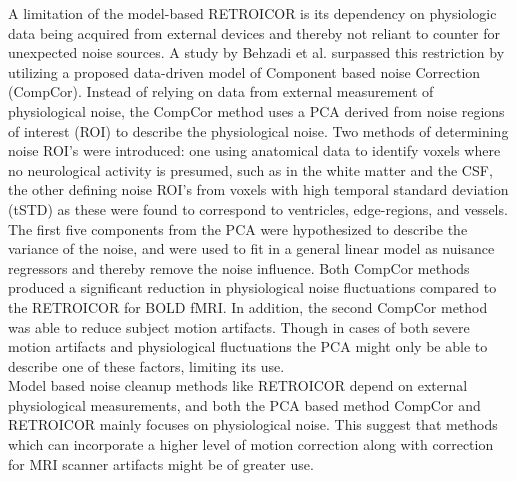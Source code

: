 A limitation of the model-based RETROICOR is its dependency on physiologic data being acquired from external devices and thereby not reliant to counter for unexpected noise sources. A study by Behzadi et al. \cite{Behzadi2013} surpassed this restriction by utilizing a proposed data-driven model of Component based noise Correction (CompCor). Instead of relying on data from external measurement of physiological noise, the CompCor method uses a PCA derived from noise regions of interest (ROI) to describe the physiological noise. Two methods of determining noise ROI’s were introduced: one using anatomical data to identify voxels where no neurological activity is presumed, such as in the white matter and the CSF, the other defining noise ROI’s from voxels with high temporal standard deviation (tSTD) as these were found to correspond to ventricles, edge-regions, and vessels. The first five components from the PCA were hypothesized to describe the variance of the noise, and were used to fit in a general linear model as nuisance regressors and thereby remove the noise influence. Both CompCor methods produced a significant reduction in physiological noise fluctuations compared to the RETROICOR for BOLD fMRI. In addition, the second CompCor method was able to reduce subject motion artifacts. Though in cases of both severe motion artifacts and physiological fluctuations the PCA might only be able to describe one of these factors, limiting its use. \cite{Behzadi2013} \\
Model based noise cleanup methods like RETROICOR depend on external physiological measurements, and both the PCA based method CompCor and RETROICOR mainly focuses on physiological noise. This suggest that methods which can incorporate a higher level of motion correction along with correction for MRI scanner artifacts might be of greater use. \\
